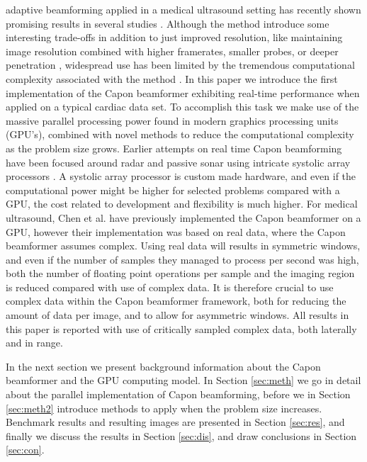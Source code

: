 \documentclass[journal]{IEEEtran}
\begin{document}
 adaptive beamforming applied in a medical ultrasound setting has recently shown promising results in several studies \cite{Synnevag2007, Austeng2008, Vignon2008, Viola, Mehdizadeh2012}. Although the method introduce some interesting trade-offs in addition to just improved resolution, like maintaining image resolution combined with higher framerates, smaller probes, or deeper penetration \cite{Synnevag2009}, widespread use has been limited by the tremendous computational complexity associated with the method \cite{So2011}.  In this paper we introduce the first implementation of the Capon beamformer exhibiting real-time performance when applied on a typical cardiac data set. To accomplish this task we make use of the massive parallel processing power found in modern graphics processing units (GPU's), combined with novel methods to reduce the computational complexity as the problem size grows. Earlier attempts on real time Capon beamforming have been focused around radar and passive sonar using intricate systolic array processors \cite{McWhirter1989, Moonen1993, Sinha2002}.  A systolic array processor is custom made hardware, and even if the computational power might be higher for selected problems compared with a GPU, the cost related to development and flexibility is much higher. For medical ultrasound, Chen et al. \cite{Chen2011a, Chen2011} have previously implemented the Capon beamformer on a GPU, however their implementation was based on real data, where the Capon beamformer assumes complex. Using real data will results in symmetric windows, and even if the number of samples they managed to process per second was high, both the number of floating point operations per sample and the imaging region is reduced compared with use of complex data. It is therefore crucial to use complex data within the Capon beamformer framework, both for reducing the amount of data per image, and to allow for asymmetric windows. All results in this paper is reported with use of critically sampled complex data, both laterally and in range.  

In the next section we present background information about the Capon beamformer and the GPU computing model. In Section \ref{sec:meth} we go in detail about the parallel implementation of Capon beamforming, before we in Section \ref{sec:meth2} introduce methods to apply when the problem size increases. Benchmark results and resulting images are presented in Section \ref{sec:res}, and finally we discuss the results in Section \ref{sec:dis}, and draw conclusions in Section \ref{sec:con}. 
\end{document}
